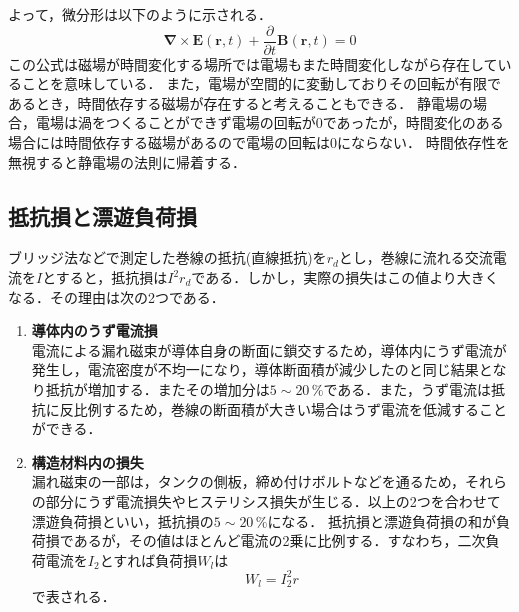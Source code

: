 よって，微分形は以下のように示される．
\begin{equation}
\boldsymbol{\nabla} \times \boldsymbol{E}(\boldsymbol{r}, t)+\frac{\partial}{\partial t}\boldsymbol{B}(\boldsymbol{r}, t)=0
\end{equation}
この公式は磁場が時間変化する場所では電場もまた時間変化しながら存在していることを意味している．
また，電場が空間的に変動しておりその回転が有限であるとき，時間依存する磁場が存在すると考えることもできる．
静電場の場合，電場は渦をつくることができず電場の回転が$0$であったが，時間変化のある場合には時間依存する磁場があるので電場の回転は$0$にならない．
時間依存性を無視すると静電場の法則に帰着する．

\subsection{抵抗損と漂遊負荷損\cite{1130282271832577152}}
ブリッジ法などで測定した巻線の抵抗(直線抵抗)を$r_{d}$とし，巻線に流れる交流電流を$I$とすると，抵抗損は$I^{2}r_{d}$である．しかし，実際の損失はこの値より大きくなる．その理由は次の2つである．
\begin{enumerate}[(1)]
	\item \textbf{導体内のうず電流損}\\
	電流による漏れ磁束が導体自身の断面に鎖交するため，導体内にうず電流が発生し，電流密度が不均一になり，導体断面積が減少したのと同じ結果となり抵抗が増加する．またその増加分は$5 \sim 20\,\%$である．また，うず電流は抵抗に反比例するため，巻線の断面積が大きい場合はうず電流を低減することができる\cite{11302822718325772}\cite{1130282270467697152}．
	\item \textbf{構造材料内の損失}\\
	漏れ磁束の一部は，タンクの側板，締め付けボルトなどを通るため，それらの部分にうず電流損失やヒステリシス損失が生じる．以上の2つを合わせて漂遊負荷損といい，抵抗損の$5 \sim 20\,\%$になる．
	抵抗損と漂遊負荷損の和が負荷損であるが，その値はほとんど電流の2乗に比例する．すなわち，二次負荷電流を$I_{2}$とすれば負荷損$W_{l}$は
	\begin{equation}
		W_{l}=I_{2}^{2}r
	\end{equation}
	で表される．
\end{enumerate}

